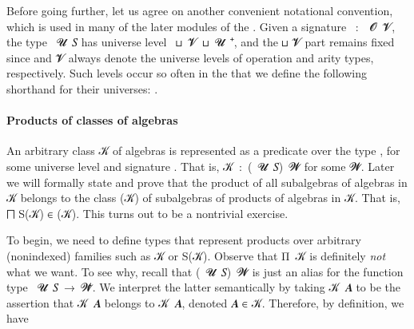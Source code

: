 \ccpad
Before going further, let us agree on another convenient notational convention, which is used in many of the later modules of the \ualib. Given a signature ~\as :~~\ab 𝓞~\ab 𝓥, the type ~\ab 𝓤~\ab 𝑆 has universe level ~\ap ⊔~\ab 𝓥~\ap ⊔~\ab 𝓤~\af ⁺, and the  \ap ⊔ \ab 𝓥 part remains fixed since  and \ab 𝓥 always denote the universe levels of operation and arity types, respectively. Such levels occur so often in the \ualib that we define the following shorthand for their universes: \AgdaSpace{}%
\AgdaSpace{}%
\AgdaSymbol{:=}\AgdaSpace{}%
\AgdaSpace{}%
\AgdaSpace{}%
\AgdaSpace{}%
\AgdaSpace{}%
\AgdaSpace{}%
.


\paragraph*{Products of classes of algebras}\label{products-of-classes-of-algebras}

An arbitrary class \ab 𝒦 of algebras is represented as a predicate over the type \AgdaSpace{}\AgdaSpace{}, for some universe level  and signature .
That is, \ab 𝒦~\as :~(~\ab 𝓤~\ab 𝑆)~𝓦 for some 𝓦.
Later we will formally state and prove that the product of all subalgebras of algebras in \ab 𝒦  belongs to the class (\ab 𝒦) of subalgebras of products of algebras in \ab 𝒦. That is, \af ⨅ \af S(\ab 𝒦) \af ∈ (\ab 𝒦). This turns out to be a nontrivial exercise.

To begin, we need to define types that represent products over arbitrary (nonindexed) families such as \ab 𝒦 or \af S(\ab 𝒦). Observe that \ad Π~\ab 𝒦 is definitely \emph{not} what we want.  To see why, recall that (~\ab 𝓤~\ab 𝑆)~\ab 𝓦 is just an alias for the function type ~\ab 𝓤~\ab 𝑆~\as →~\ab 𝓦\af ̇. We interpret the latter semantically by taking \ab 𝒦~\ab 𝑨 to be the assertion that \ab 𝒦~\ab 𝑨 belongs to \ab 𝒦~\ab 𝑨, denoted \ab 𝑨 ∈ \ab 𝒦. Therefore, by definition, we have\\[-10pt]

